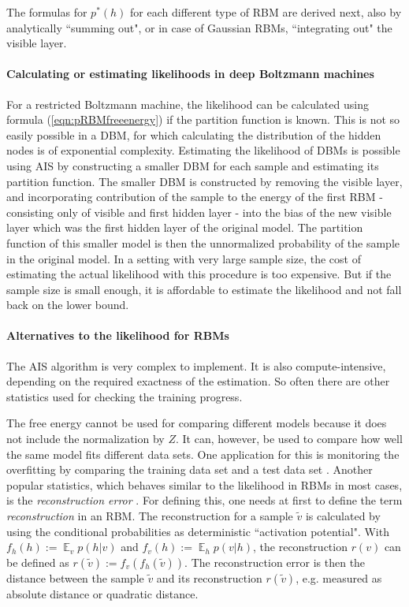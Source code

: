 \documentclass[12pt]{article}
\DeclareMathOperator{\EX}{\mathbb{E}}
\begin{document}
The formulas for $p^*(h)$ for each different type of RBM are derived next, also by analytically ``summing out", or in case of Gaussian RBMs, ``integrating out" the visible layer.


\paragraph{Calculating or estimating likelihoods in deep Boltzmann machines}
For a restricted Boltzmann machine, the likelihood can be calculated using formula (\ref{eqn:pRBMfreeenergy}) if the partition function is known. This is not so easily possible in a DBM, for which calculating the distribution of the hidden nodes is of exponential complexity.
Estimating the likelihood of DBMs is possible using AIS by constructing a smaller DBM for each sample and estimating its partition function.
The smaller DBM is constructed by removing the visible layer, and incorporating contribution of the sample to the energy of the first RBM - consisting only of visible and first hidden layer - into the bias of the new visible layer which was the first hidden layer of the original model.
The partition function of this smaller model is then the unnormalized probability of the sample in the original model.
In a setting with very large sample size, the cost of estimating the actual likelihood with this procedure is too expensive. But if the sample size is small enough, it is affordable to estimate the likelihood and not fall back on the lower bound.

\paragraph{Alternatives to the likelihood for RBMs}
The AIS algorithm is very complex to implement.
It is also compute-intensive, depending on the required exactness of the estimation.
So often there are other statistics used for checking the training progress.

The free energy cannot be used for comparing different models because it does not include the normalization by $Z$.
It can, however, be used to compare how well the same model fits different data sets.
One application for this is monitoring the overfitting by comparing the training data set and a test data set \citep{hinton_practical_2012}.
\label{reconstructionerror}
Another popular statistics, which behaves similar to the likelihood in RBMs in most cases, is the {\em reconstruction error} \citep{hinton_practical_2012}.
For defining this, one needs at first to define the term {\em reconstruction} in an RBM.
The reconstruction \citep{hinton_practical_2012} for a sample $\widetilde{v}$ is calculated by using the conditional probabilities as deterministic ``activation potential".
With $f_h(h) := \EX_v p(h|v)$ and $f_v(h) := \EX_h p(v|h)$, the reconstruction $r(v)$ can be defined as $r(\widetilde{v}) := f_v(f_h(\widetilde{v}))$. The reconstruction error is then the distance between the sample $\widetilde{v}$ and its reconstruction $r(\widetilde{v})$, e.g. measured as absolute distance or quadratic distance.
\end{document}
